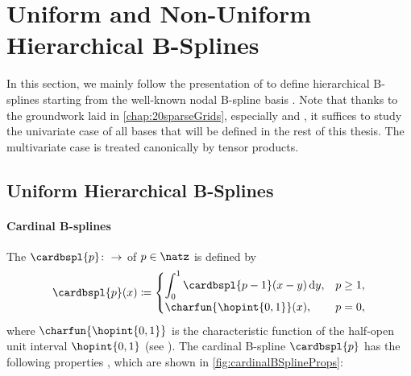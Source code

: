 \section{Uniform and Non-Uniform Hierarchical B-Splines}
\label{sec:31standardBSplines}


\noindent
In this section, we mainly follow the presentation of
to define hierarchical B-splines
starting from the well-known nodal B-spline basis
.
Note that thanks to the groundwork laid in \cref{chap:20sparseGrids},
especially  and
,
it suffices to study the univariate case
of all bases that will be defined in the rest of this thesis.
The multivariate case is treated canonically by tensor products.



\subsection{Uniform Hierarchical B-Splines}
\label{sec:311uniform}

\paragraph{Cardinal B-splines}

The 
$\cardbspl{p}\colon \real \to \real$ of  $p \in \natz$
is defined by
\begin{equation}
  \label{eq:cardinalBSpline}
  \cardbspl{p}(x)
  \ceq
  \begin{cases}
    \displaystyle\int_0^1 \cardbspl{p-1}(x - y) \diff{}y,&p \ge 1,\\
    \charfun{\hopint{0, 1}}(x),&p = 0,
  \end{cases}
\end{equation}
where $\charfun{\hopint{0, 1}}$ is the characteristic function of
the half-open unit interval $\hopint{0, 1}$
(see \cite{Hoellig13Approximation}).
The cardinal B-spline $\cardbspl{p}$ has the following properties
\cite{Hoellig03Finite},
which are shown in \cref{fig:cardinalBSplineProps}:

